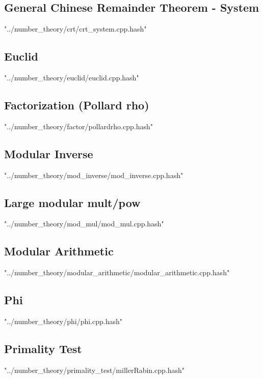 \documentclass [12pt,onecolumn,oneside]{article}
\begin{document}
\subsection{ General Chinese Remainder Theorem - System}
 {"../number_theory/crt/crt_system.cpp.hash"}
\newpage

\subsection{ Euclid}
 {"../number_theory/euclid/euclid.cpp.hash"}
\newpage

\subsection{ Factorization (Pollard rho)}
 {"../number_theory/factor/pollardrho.cpp.hash"}
\newpage

\subsection{ Modular Inverse}
 {"../number_theory/mod_inverse/mod_inverse.cpp.hash"}
\newpage

\subsection{ Large modular mult/pow}
 {"../number_theory/mod_mul/mod_mul.cpp.hash"}
\newpage

\subsection{ Modular Arithmetic}
 {"../number_theory/modular_arithmetic/modular_arithmetic.cpp.hash"}
\newpage

\subsection{ Phi}
 {"../number_theory/phi/phi.cpp.hash"}
\newpage

\subsection{ Primality Test}
 {"../number_theory/primality_test/millerRabin.cpp.hash"}
\newpage
\end{document}
